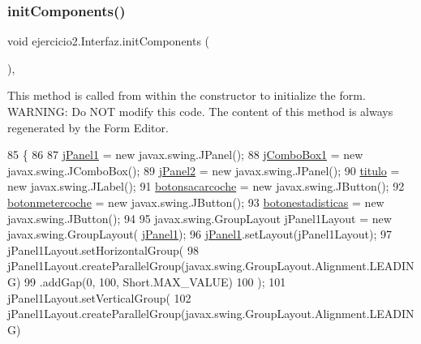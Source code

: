 \subsubsection{\texorpdfstring{init\+Components()}{initComponents()}}
{\footnotesize\ttfamily void ejercicio2.\+Interfaz.\+init\+Components (\begin{DoxyParamCaption}{ }\end{DoxyParamCaption})\hspace{0.3cm}{\ttfamily [inline]}, {\ttfamily [private]}}

This method is called from within the constructor to initialize the form. W\+A\+R\+N\+I\+NG\+: Do N\+OT modify this code. The content of this method is always regenerated by the Form Editor. 
\begin{DoxyCode}
85                                   \{
86 
87         \mbox{\hyperlink{classejercicio2_1_1_interfaz_a7cb66fff39e6e8d10acc8ec7f1d42a70}{jPanel1}} = \textcolor{keyword}{new} javax.swing.JPanel();
88         \mbox{\hyperlink{classejercicio2_1_1_interfaz_a132c36c6003bac5a001076557090fa40}{jComboBox1}} = \textcolor{keyword}{new} javax.swing.JComboBox();
89         \mbox{\hyperlink{classejercicio2_1_1_interfaz_a6ef595f7c876b199b34095e19c5b206a}{jPanel2}} = \textcolor{keyword}{new} javax.swing.JPanel();
90         \mbox{\hyperlink{classejercicio2_1_1_interfaz_af6343959b01523a71cdf2296b61672e0}{titulo}} = \textcolor{keyword}{new} javax.swing.JLabel();
91         \mbox{\hyperlink{classejercicio2_1_1_interfaz_a643d25060e73ac4c53a95d7b4bfdae52}{botonsacarcoche}} = \textcolor{keyword}{new} javax.swing.JButton();
92         \mbox{\hyperlink{classejercicio2_1_1_interfaz_a312037c2c5b2cd0f23fd65998314ee09}{botonmetercoche}} = \textcolor{keyword}{new} javax.swing.JButton();
93         \mbox{\hyperlink{classejercicio2_1_1_interfaz_a7385c1fb6e098f60bb5a8b4b7a31fd65}{botonestadisticas}} = \textcolor{keyword}{new} javax.swing.JButton();
94 
95         javax.swing.GroupLayout jPanel1Layout = \textcolor{keyword}{new} javax.swing.GroupLayout(
      \mbox{\hyperlink{classejercicio2_1_1_interfaz_a7cb66fff39e6e8d10acc8ec7f1d42a70}{jPanel1}});
96         \mbox{\hyperlink{classejercicio2_1_1_interfaz_a7cb66fff39e6e8d10acc8ec7f1d42a70}{jPanel1}}.setLayout(jPanel1Layout);
97         jPanel1Layout.setHorizontalGroup(
98             jPanel1Layout.createParallelGroup(javax.swing.GroupLayout.Alignment.LEADING)
99             .addGap(0, 100, Short.MAX\_VALUE)
100         );
101         jPanel1Layout.setVerticalGroup(
102             jPanel1Layout.createParallelGroup(javax.swing.GroupLayout.Alignment.LEADING)

\end{DoxyCode}
